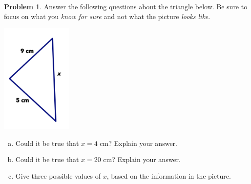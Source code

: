 \documentclass[12pt, reqno]{amsart}
\theoremstyle{remark}
\theoremstyle{definition}
\newtheorem{problem}{Problem}
\numberwithin{equation}{section}  %
\begin{document}
\begin{problem}
Answer the following questions about the triangle below.  Be sure to focus on what you \emph{know for sure} and not what the picture \emph{looks like}.

\begin{center}
\includegraphics[height=5.5cm]{triineq2}
\end{center}


\begin{enumerate}[(a)]
\item
Could it be true that $x = 4$ cm?  Explain your answer.\\

\item
Could it be true that $x=20$ cm?  Explain your answer.\\

\item
Give three possible values of $x$, based on the information in the picture.\\
\end{enumerate}

\end{problem}

\bigskip
\end{document}
